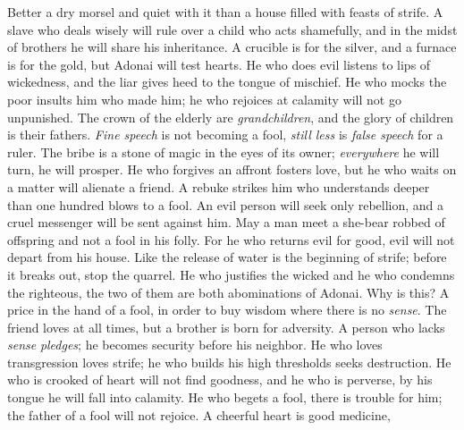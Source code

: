 \begin{biblechapter} %
\verse Better a dry morsel and quiet with it 
than a house filled with feasts of strife.
\verse A slave who deals wisely will rule over a child who acts shamefully, 
and in the midst of brothers he will share his inheritance.
\verse A crucible is for the silver, and a furnace is for the gold, 
but Adonai will test hearts.
\verse He who does evil listens to lips of wickedness, 
and the liar gives heed to the tongue of mischief.
\verse He who mocks the poor insults him who made him; 
he who rejoices at calamity will not go unpunished.
\verse The crown of the elderly are \textit{grandchildren}, 
and the glory of children is their fathers.
\verse \textit{Fine speech} is not becoming a fool, 
\textit{still less} is \textit{false speech} for a ruler.
\verse The bribe is a stone of magic in the eyes of its owner; 
\textit{everywhere} he will turn, he will prosper.
\verse He who forgives an affront fosters love, 
but he who waits on a matter will alienate a friend.
\verse A rebuke strikes him who understands 
deeper than one hundred blows to a fool.
\verse An evil person will seek only rebellion, 
and a cruel messenger will be sent against him.
\verse May a man meet a she-bear robbed of offspring 
and not a fool in his folly.
\verse For he who returns evil for good, 
evil will not depart from his house.
\verse Like the release of water is the beginning of strife; 
before it breaks out, stop the quarrel.
\verse He who justifies the wicked and he who condemns the righteous, 
the two of them are both abominations of Adonai.
\verse Why is this? A price in the hand of a fool, 
in order to buy wisdom where there is no \textit{sense}.
\verse The friend loves at all times, 
but a brother is born for adversity.
\verse A person who lacks \textit{sense} \textit{pledges}; 
he becomes security before his neighbor.
\verse He who loves transgression loves strife; 
he who builds his high thresholds seeks destruction.
\verse He who is crooked of heart will not find goodness, 
and he who is perverse, by his tongue he will fall into calamity.
\verse He who begets a fool, there is trouble for him; 
the father of a fool will not rejoice.
\verse A cheerful heart is good medicine, 

\end{biblechapter}
